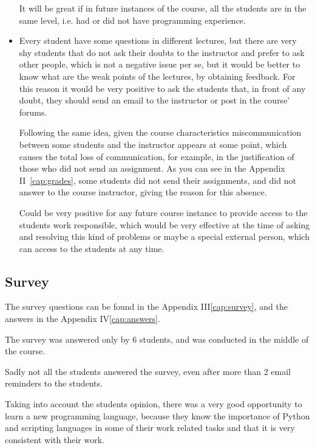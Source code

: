 \documentclass[letter, 10pt]{article}
\begin{document}
\begin{itemize}
          It will be great if in future instances of the course, all the students
          are in the same level, i.e. had or did not have programming experience.

    \item Every student have some questions in different lectures,
          but there are very shy students that do not ask their doubts to the
          instructor and prefer to ask other people, which is not a negative
          issue per se, but it would be better to know what are the weak points
          of the lectures, by obtaining feedback. For this reason it would be
          very positive to ask the students that, in front of any doubt, they
          should send an email to the instructor or post in the course' forums.

          Following the same idea, given the course characteristics
          miscommunication between some students and the instructor appears at
          some point, which causes the total loss of communication, for
          example, in the justification of those who did not send an assignment.
          As you can see in the Appendix II~\ref{cap:grades},
          some students did not send their assignments,
          and did not answer to the course instructor,
          giving the reason for this absence.

          Could be very positive for any future course instance
          to provide access to the students work responsible,
          which would be very effective at the time of asking
          and resolving this kind of problems
          or maybe a special external person,
          which can access to the students at any time.
\end{itemize}

\subsection{Survey}

The survey questions can be found in the Appendix III\ref{cap:survey},
and the answers in the Appendix IV\ref{cap:answers}.

The survey was answered only by 6 students,
and was conducted in the middle of the course. 

Sadly not all the students answered the survey,
even after more than 2 email reminders to the students.

Taking into account the students opinion,
there was a very good opportunity to learn a new programming language,
because they know the importance of Python and scripting languages in some of
their work related tasks and that it is very consistent with their work.
\end{document}

